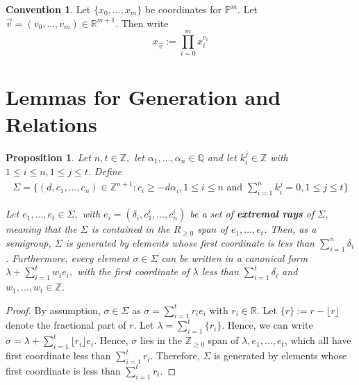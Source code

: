 \documentclass{amsart}
\theoremstyle{plain}
\newtheorem{prop}[thm]{Proposition}
\theoremstyle{definition}
\newtheorem{convention}[thm]{Convention}
\theoremstyle{remark}
\numberwithin{equation}{section}
\newcommand\br{{\mathbb R}}
\newcommand\bq{{\mathbb Q}}
\newcommand\bp{{\mathbb P}}
\newcommand\bz{{\mathbb Z}}
\newcommand\pdeg{\delta}
\begin{document}
\begin{convention}
Let $\{x_0, \ldots, x_m\}$ be coordinates for $\bp^m$. Let
$\vec{v} = (v_0, \ldots, v_m) \in \br^{m + 1}$. Then write
\[
	x_{\vec{v}} := \prod_{i = 0}^{m} x_i^{v_i}
\]
\end{convention}

\section{Lemmas for Generation and Relations}

\begin{prop}
\label{prop:cone-generation}
Let $n,t \in \bz,$ let $\alpha_1, \ldots, \alpha_n \in \bq$ and let $k_i^j \in \bz$ with $1 \leq i \leq n, 1 \leq j \leq t.$ Define
\begin{align*}
	\Sigma = \{(d, c_1, \ldots, c_n) \in \bz^{n+1} : c_i \geq - d \alpha_i,1 \leq i \leq n \text{ and } \sum_{i=1}^{n}k_i^j = 0, 1 \leq j \leq t\}
\end{align*}

\noindent
Let $e_1, \ldots, e_t \in \Sigma,$ with $e_i = (\pdeg_i, c_1^i,
\ldots, c_n^i)$ be a set of {\bf extremal rays} of $\Sigma$,
meaning that the $\Sigma$ is contained in the $R_{\geq 0}$ span of
$e_1, \ldots, e_t$.  Then, as a semigroup, $\Sigma$ is generated by
elements whose first coordinate is less than $\sum_{i = 1}^{n} \pdeg_i$
. Furthermore, every element $\sigma \in \Sigma$ can be written in
a canonical form $\lambda + \sum_{i=1}^{t} w_i e_i,$ with the first
coordinate of $\lambda$ less than $\sum_{i=1}^{t}\pdeg_i$ and $w_1,
\ldots, w_t \in \bz$.
\end{prop}

\begin{proof}
By assumption, $\sigma \in \Sigma$ as $\sigma = \sum_{i=1}^{t} r_i e_i$ with $r_i \in \br$. Let $\{r\} := r - \lfloor r \rfloor$ denote the fractional part of $r$. Let $\lambda = \sum_{i=1}^{t}\{r_i\}$. Hence, we can write $\sigma = \lambda + \sum_{i=1}^{t}\lfloor r_i \rfloor e_i.$ Hence, $\sigma$ lies in the $\bz_{\geq 0}$ span of $\lambda, e_1,\ldots, e_t$, which all have first coordinate less than $\sum_{i=1}^{t}r_i$. Therefore, $\Sigma$ is generated by elements whose first coordinate is less than $\sum_{i=1}^{t}r_i$.
\end{proof}
\end{document}
